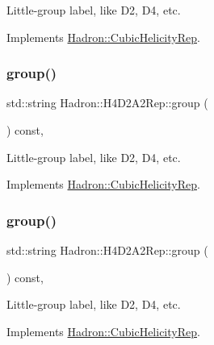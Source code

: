 Little-\/group label, like D2, D4, etc. 

Implements \mbox{\hyperlink{structHadron_1_1CubicHelicityRep_a101a7d76cd8ccdad0f272db44b766113}{Hadron\+::\+Cubic\+Helicity\+Rep}}.

\mbox{\label{structHadron_1_1H4D2A2Rep_aa2ecad1777dd00c1a36199688495a9ac}} 
\subsubsection{\texorpdfstring{group()}{group()}\hspace{0.1cm}{\footnotesize\ttfamily [3/5]}}
{\footnotesize\ttfamily std\+::string Hadron\+::\+H4\+D2\+A2\+Rep\+::group (\begin{DoxyParamCaption}{ }\end{DoxyParamCaption}) const\hspace{0.3cm}{\ttfamily [inline]}, {\ttfamily [virtual]}}

Little-\/group label, like D2, D4, etc. 

Implements \mbox{\hyperlink{structHadron_1_1CubicHelicityRep_a101a7d76cd8ccdad0f272db44b766113}{Hadron\+::\+Cubic\+Helicity\+Rep}}.

\mbox{\label{structHadron_1_1H4D2A2Rep_aa2ecad1777dd00c1a36199688495a9ac}} 
\subsubsection{\texorpdfstring{group()}{group()}\hspace{0.1cm}{\footnotesize\ttfamily [4/5]}}
{\footnotesize\ttfamily std\+::string Hadron\+::\+H4\+D2\+A2\+Rep\+::group (\begin{DoxyParamCaption}{ }\end{DoxyParamCaption}) const\hspace{0.3cm}{\ttfamily [inline]}, {\ttfamily [virtual]}}

Little-\/group label, like D2, D4, etc. 

Implements \mbox{\hyperlink{structHadron_1_1CubicHelicityRep_a101a7d76cd8ccdad0f272db44b766113}{Hadron\+::\+Cubic\+Helicity\+Rep}}.

\mbox{\label{structHadron_1_1H4D2A2Rep_aa2ecad1777dd00c1a36199688495a9ac}} 
